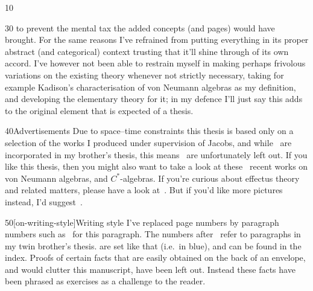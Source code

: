 \documentclass[b5paper]{book}
\begin{document}
\begin{parsec}{10}
\begin{point}{30}
to  prevent the mental tax
the added concepts
(and pages) would have brought.
For the same reasons
I've refrained from putting
everything in its proper abstract (and categorical\cite{maclane}) context
trusting that it'll shine through of its own accord.
I've however not been able to restrain
myself in making perhaps frivolous variations on the existing
theory whenever not strictly necessary,
taking for example Kadison's characterisation\cite{kadison1956}
of von Neumann algebras
as my definition,
and developing the elementary theory for it;
in my defence I'll just say this adds to
the original element that is expected of a thesis.
\end{point}
\begin{point}{40}{Advertisements}%
Due to space--time constraints
this thesis is based only on a selection
\cite{model,cho2015quotient,cho2016duplicable,qpakm,westerbaan2016universal}
of the works
I produced under supervision of Jacobs,
and while~\cite{wwpaschke,effintro,statesofconvexsets}
are incorporated in my brother's thesis,
this means~\cite{jacobs2015effect,jacobs2017distances} 
are unfortunately left out.
If you like this thesis,
then
you might also want to take a look
at these~\cite{rennela2017infinite,
rennela2015complete,
furber2013kleisli,
kornell2012,
heunen2015domains,
Maassen2010} recent works on von Neumann algebras,
and $C^*$-algebras.
If you're curious
about effectus theory
and related matters,
please have a look at~\cite{jacobs2017quantum,
cho2017disintegration,
jacobs2016hyper,
jacobs2017channel,
jacobs2017formal,
cho2017efprob,
jacobs2017probability,
jacobs2017recipe,
jacobs2016effectuses,
jacobs2016affine,
jacobs2016relating,
effintro,
statesofconvexsets,
cho2015quotient,
jacobs2017distances,
jacobs2015effect,
jacobs2016expectation,
jacobs2016predicate,
newdirections}.
But if you'd like more pictures instead,
I'd suggest~\cite{coecke2017picturing}.
\end{point}
\begin{point}{50}[on-writing-style]{Writing style}
I've replaced page numbers by
paragraph numbers
such as~
for this paragraph.
The numbers after~ refer to paragraphs
	in my twin brother's thesis\cite{bas}.
 are set like that
(i.e.~in blue),
and can be found in the index.
Proofs of certain facts
that are easily obtained on the back of an envelope,
and would clutter this manuscript,
have been left out.
Instead these facts have been phrased as exercises
as a challenge to the reader.
\end{point}

\end{parsec}
\end{document}
